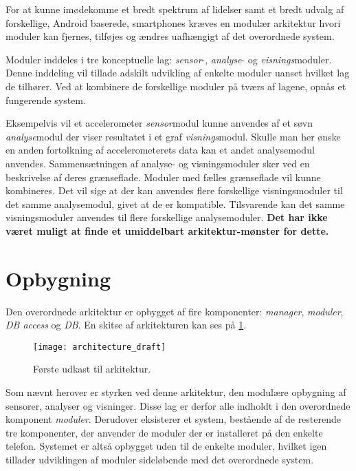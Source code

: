 For at kunne imødekomme et bredt spektrum af lidelser samt et bredt udvalg af forskellige, Android baserede, smartphones kræves en modulær arkitektur hvori moduler kan fjernes, tilføjes og ændres uafhængigt af det overordnede system.

Moduler inddeles i tre konceptuelle lag: \textit{sensor}-, \textit{analyse}- og \textit{visnings}moduler.
Denne inddeling vil tillade adskilt udvikling af enkelte moduler uanset hvilket lag de tilhører.
Ved at kombinere de forskellige moduler på tværs af lagene, opnås et fungerende system.

Eksempelvis vil et accelerometer \textit{sensor}modul kunne anvendes af et søvn \textit{analyse}modul der viser resultatet i et graf \textit{visnings}modul.
Skulle man her ønske en anden fortolkning af accelerometerets data kan et andet analysemodul anvendes.
Sammensætningen af analyse- og visningsmoduler sker ved en beskrivelse af deres grænseflade.
Moduler med fælles grænseflade vil kunne kombineres.
Det vil sige at der kan anvendes flere forskellige visningsmoduler til det samme analysemodul, givet at de er kompatible.
Tilsvarende kan det samme visningsmoduler anvendes til flere forskellige analysemoduler.
\textbf{Det har ikke været muligt at finde et umiddelbart arkitektur-mønster for dette.}

\section*{Opbygning}
Den overordnede arkitektur er opbygget af fire komponenter: \textit{manager}, \textit{moduler}, \textit{DB access} og \textit{DB}.
En skitse af arkitekturen kan ses på \cref{arkitektur_udkast_1}.
\begin{figure}[h]
	\texttt{[image: architecture\_draft]}
	\caption{Første udkast til arkitektur.}
  \label{arkitektur_udkast_1}
\end{figure}
Som nævnt herover er styrken ved denne arkitektur, den modulære opbygning af sensorer, analyser og visninger.
Disse lag er derfor alle indholdt i den overordnede komponent \textit{moduler}.
Derudover eksisterer et system, bestående af de resterende tre komponenter, der anvender de moduler der er installeret på den enkelte telefon. 
Systemet er altså opbygget uden  til de enkelte moduler, hvilket igen tillader udviklingen af moduler sideløbende med det overordnede system.

